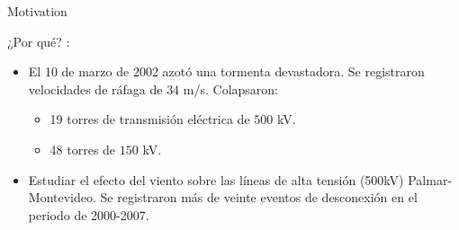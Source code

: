 \documentclass{beamer}
\begin{document}
\begin{frame}{Motivation}{}


 \begin{block}{¿Por qué? : }
 \begin{itemize}
\item El 10 de marzo de 2002 azotó una tormenta devastadora. Se registraron velocidades de ráfaga de $34$ m/s. Colapsaron:
\begin{itemize}
    \item 19 torres de transmisión eléctrica de $500$ kV.
    \item 48 torres de $150$ kV.
\end{itemize} 
\item  Estudiar el efecto del viento sobre las líneas de alta tensión (500kV) Palmar-Montevideo. Se registraron más de veinte eventos de desconexión en el periodo de 2000-2007.
\end{itemize}
 \end{block}



\end{frame}
\end{document}
